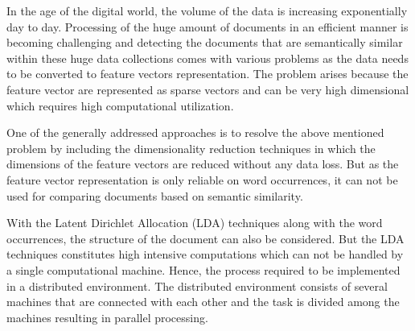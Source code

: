 \label{introduction}

In the age of the digital world, the volume of the data is increasing exponentially day to day. Processing of the huge amount of documents in an efficient manner is becoming challenging and detecting the documents that are semantically similar within these huge data collections comes with various problems as the data needs to be converted to feature vectors representation. The problem arises because the feature vector are represented as sparse vectors and can be very high dimensional which requires high computational utilization.

\par One of the generally addressed approaches is to resolve the above mentioned problem by including the dimensionality reduction techniques in which the dimensions of the feature vectors are reduced without any data loss. But as the feature vector representation is only reliable on word occurrences, it can not be used for comparing documents based on semantic similarity. 

\par With the Latent Dirichlet Allocation (LDA) techniques along with the word occurrences, the structure of the document can also be considered. But the LDA techniques constitutes high intensive computations which can not be handled by a single computational machine. Hence, the process required to be implemented in a distributed environment. The distributed environment consists of several machines that are connected with each other and the task is divided among the machines resulting in parallel processing.

